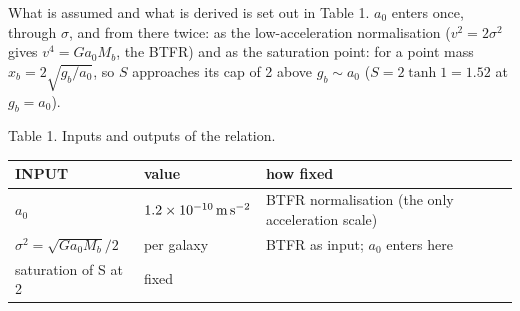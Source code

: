 \documentclass[
  10pt,
]{article}
\begin{document}
What is assumed and what is derived is set out in Table 1. $a_0$ enters
once, through $\sigma$, and from there twice: as the low-acceleration
normalisation ($v^2=2\sigma^2$ gives $v^4=G a_0 M_b$, the BTFR)
and as the saturation point: for a point mass $x_b=2\sqrt{g_b/a_0}$, so $S$ approaches its cap of 2 above $g_b\sim a_0$ ($S=2\tanh 1=1.52$ at $g_b=a_0$).

Table 1. Inputs and outputs of the relation.

\begin{longtable}[]{@{}lll@{}}
\toprule
\begin{minipage}[b]{0.24\columnwidth}\raggedright
INPUT\strut
\end{minipage} & \begin{minipage}[b]{0.20\columnwidth}\raggedright
value\strut
\end{minipage} & \begin{minipage}[b]{0.50\columnwidth}\raggedright
how fixed\strut
\end{minipage}\tabularnewline
\midrule
\endhead
\begin{minipage}[t]{0.24\columnwidth}\raggedright
$a_0$\strut
\end{minipage} & \begin{minipage}[t]{0.20\columnwidth}\raggedright
$1.2\times10^{-10}\,{\rm m\,s^{-2}}$\strut
\end{minipage} & \begin{minipage}[t]{0.50\columnwidth}\raggedright
BTFR normalisation (the only acceleration scale)\strut
\end{minipage}\tabularnewline
\begin{minipage}[t]{0.24\columnwidth}\raggedright
$\sigma^2=\sqrt{G a_0 M_b}/2$\strut
\end{minipage} & \begin{minipage}[t]{0.20\columnwidth}\raggedright
per galaxy\strut
\end{minipage} & \begin{minipage}[t]{0.50\columnwidth}\raggedright
BTFR as input; $a_0$ enters here\strut
\end{minipage}\tabularnewline
\begin{minipage}[t]{0.24\columnwidth}\raggedright
saturation of S at 2\strut
\end{minipage} & \begin{minipage}[t]{0.20\columnwidth}\raggedright
fixed\strut
\end{minipage} & \begin{minipage}[t]{0.50\columnwidth}\raggedright

\end{minipage}
\end{longtable}
\end{document}

